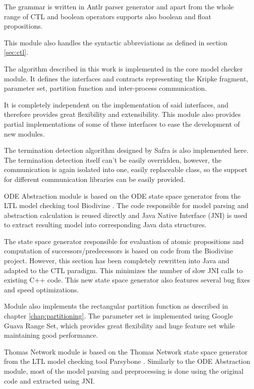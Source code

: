 \documentclass[12pt,oneside]{fithesis2}
\begin{document}
		The grammar is written in Antlr parser generator and apart from the whole range of CTL and boolean operators supports also boolean and float propositions.
				
		This module also handles the syntactic abbreviations as defined in section \ref{sec:ctl}.
				
			
		The algorithm described in this work is implemented in the core model checker module. It defines the interfaces and contracts representing the Kripke fragment, parameter set, partition function and inter-process communication.
				
			It is completely independent on the implementation of said interfaces, and therefore provides great flexibility and extensibility. This module also provides partial implementations of some of these interfaces to ease the development of new modules. 
				
			The termination detection algorithm designed by Safra \cite{safra} is also implemented here. The termination detection itself can't be easily overridden, however, the communication is again isolated into one, easily replaceable class, so the support for different communication libraries can be easily provided.
	
			ODE Abstraction module is based on the ODE state space generator from the LTL model checking tool Biodivine \cite{biodivine}. The code responsible for model parsing and abstraction calculation is reused directly and Java Native Interface (JNI) is used to extract resulting model into corresponding Java data structures.
				
			The state space generator responsible for evaluation of atomic propositions and computation of successors/predecessors is based on code from the Biodivine project. However, this section has been completely rewritten into Java and adapted to the CTL paradigm. This minimizes the number of slow JNI calls to existing C++ code. This new state space generator also features several bug fixes and speed optimizations.
				
			Module also implements the rectangular partition function as described in chapter \ref{chap:partitioning}. The parameter set is implemented using Google Guava Range Set, which provides great flexibility and huge feature set while maintaining good performance.
				
			Thomas Network module is based on the Thomas Network state space generator from the LTL model checking tool Parsybone \cite{parsybone}. Similarly to the ODE Abstraction module, most of the model parsing and preprocessing is done using the original code and extracted using JNI. 
				
\end{document}
